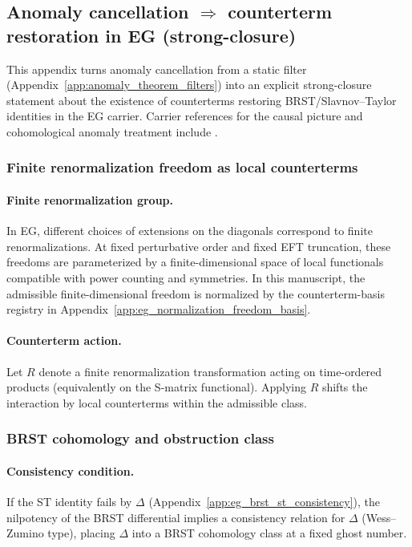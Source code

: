 \subsection{Anomaly cancellation $\Rightarrow$ counterterm restoration in EG (strong-closure)}
\label{app:eg_anomaly_counterterm_restoration}

\AuditTag This appendix turns anomaly cancellation from a static filter (Appendix~\ref{app:anomaly_theorem_filters}) into an explicit strong-closure statement about the existence of counterterms restoring BRST/Slavnov--Taylor identities in the EG carrier.
Carrier references for the causal picture and cohomological anomaly treatment include \cite{EpsteinGlaser1973,BrunettiFredenhagen2000Microlocal,Dutsch2019pAQFT,BecchiRouetStora1976,Tyutin1975}.

\subsubsection{Finite renormalization freedom as local counterterms}
\paragraph{Finite renormalization group.}
In EG, different choices of extensions on the diagonals correspond to finite renormalizations.
At fixed perturbative order and fixed EFT truncation, these freedoms are parameterized by a finite-dimensional space of local functionals compatible with power counting and symmetries.
In this manuscript, the admissible finite-dimensional freedom is normalized by the counterterm-basis registry in Appendix~\ref{app:eg_normalization_freedom_basis}.

\paragraph{Counterterm action.}
Let $R$ denote a finite renormalization transformation acting on time-ordered products (equivalently on the S-matrix functional).
Applying $R$ shifts the interaction by local counterterms within the admissible class.

\subsubsection{BRST cohomology and obstruction class}
\paragraph{Consistency condition.}
If the ST identity fails by $\Delta$ (Appendix~\ref{app:eg_brst_st_consistency}), the nilpotency of the BRST differential implies a consistency relation for $\Delta$ (Wess--Zumino type), placing $\Delta$ into a BRST cohomology class at a fixed ghost number.

